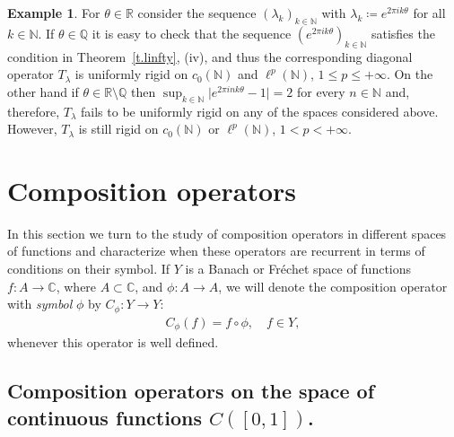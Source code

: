 \documentclass[12pt,leqno]{amsart}
\theoremstyle{plain}
\theoremstyle{definition}
\newtheorem{example}[equation]{Example}
\numberwithin{equation}{section}
\begin{document}
\begin{example}\label{ex.rignounif}
	For $\theta \in {\mathbb R}$ consider the sequence $(\lambda_k)_{k\in\mathbb N}$ with $\lambda_k\coloneqq e^{2\pi i k\theta}$ for all $k\in\mathbb N$. If $\theta \in \mathbb Q$ it is easy to check that the sequence $(e^{2\pi i k\theta})_{k\in\mathbb N}$ satisfies the condition in Theorem~\ref{t.linfty}, (iv), and thus the corresponding diagonal operator $T_\lambda$ is uniformly rigid on $c_0(\mathbb N)$ and $\ell^p(\mathbb N)$, $1\leq p\leq +\infty$. On the other hand if $\theta \in {\mathbb R}\setminus \mathbb Q$ then $ \sup_{k\in\mathbb N}{\lvert{e^{2\pi i n k\theta }-1}\rvert}=2$ for every $n\in\mathbb N$ and, therefore, $T_\lambda$ fails to be uniformly rigid on any of the spaces considered above. However, $T_\lambda$ is still rigid on $c_0(\mathbb N)$ or $\ell^p(\mathbb N)$, $1<p<+\infty$. 
\end{example}

\section{Composition operators} In this section we turn to the study of composition operators in different spaces of functions and characterize when these operators are recurrent in terms of conditions on their symbol. If $Y$ is a Banach or Fr\'echet space of functions $f:A\to {\mathbb C}$, where $A\subset {\mathbb C}$, and $\phi:A\to A$, we will denote the composition operator with \emph{symbol} $\phi$ by $C_\phi:Y\to Y$: 
\begin{align*}
	C_\phi(f)=f\circ \phi,\quad f\in Y, 
\end{align*}
whenever this operator is well defined.

\subsection{Composition operators on the space of continuous functions \texorpdfstring{$C([0,1])$}{C([0,1])}.}\label{s.compcont}
\end{document}
